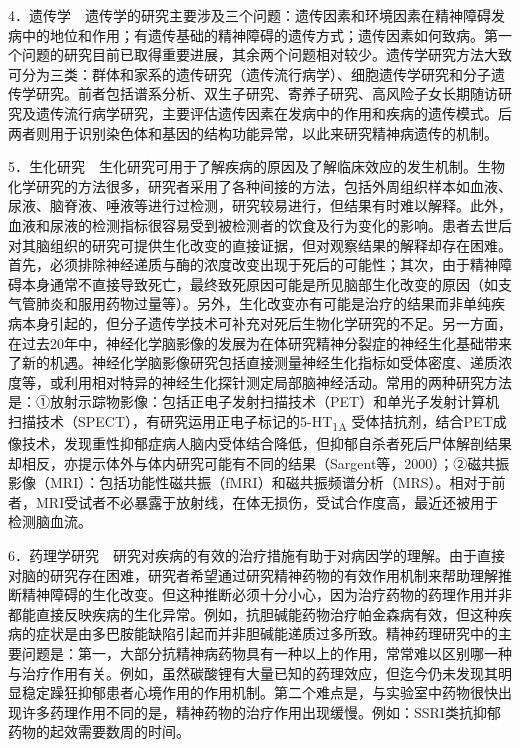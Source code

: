 4．遗传学　遗传学的研究主要涉及三个问题：遗传因素和环境因素在精神障碍发病中的地位和作用；有遗传基础的精神障碍的遗传方式；遗传因素如何致病。第一个问题的研究目前已取得重要进展，其余两个问题相对较少。遗传学研究方法大致可分为三类：群体和家系的遗传研究（遗传流行病学）、细胞遗传学研究和分子遗传学研究。前者包括谱系分析、双生子研究、寄养子研究、高风险子女长期随访研究及遗传流行病学研究，主要评估遗传因素在发病中的作用和疾病的遗传模式。后两者则用于识别染色体和基因的结构功能异常，以此来研究精神病遗传的机制。

5．生化研究　生化研究可用于了解疾病的原因及了解临床效应的发生机制。生物化学研究的方法很多，研究者采用了各种间接的方法，包括外周组织样本如血液、尿液、脑脊液、唾液等进行过检测，研究较易进行，但结果有时难以解释。此外，血液和尿液的检测指标很容易受到被检测者的饮食及行为变化的影响。患者去世后对其脑组织的研究可提供生化改变的直接证据，但对观察结果的解释却存在困难。首先，必须排除神经递质与酶的浓度改变出现于死后的可能性；其次，由于精神障碍本身通常不直接导致死亡，最终致死原因可能是所见脑部生化改变的原因（如支气管肺炎和服用药物过量等）。另外，生化改变亦有可能是治疗的结果而非单纯疾病本身引起的，但分子遗传学技术可补充对死后生物化学研究的不足。另一方面，在过去20年中，神经化学脑影像的发展为在体研究精神分裂症的神经生化基础带来了新的机遇。神经化学脑影像研究包括直接测量神经生化指标如受体密度、递质浓度等，或利用相对特异的神经生化探针测定局部脑神经活动。常用的两种研究方法是：①放射示踪物影像：包括正电子发射扫描技术（PET）和单光子发射计算机扫描技术（SPECT），有研究运用正电子标记的5-HT\textsubscript{1A}
受体拮抗剂，结合PET成像技术，发现重性抑郁症病人脑内受体结合降低，但抑郁自杀者死后尸体解剖结果却相反，亦提示体外与体内研究可能有不同的结果（Sargent等，2000）；②磁共振影像（MRI）：包括功能性磁共振（fMRI）和磁共振频谱分析（MRS）。相对于前者，MRI受试者不必暴露于放射线，在体无损伤，受试合作度高，最近还被用于检测脑血流。

6．药理学研究　研究对疾病的有效的治疗措施有助于对病因学的理解。由于直接对脑的研究存在困难，研究者希望通过研究精神药物的有效作用机制来帮助理解推断精神障碍的生化改变。但这种推断必须十分小心，因为治疗药物的药理作用并非都能直接反映疾病的生化异常。例如，抗胆碱能药物治疗帕金森病有效，但这种疾病的症状是由多巴胺能缺陷引起而并非胆碱能递质过多所致。精神药理研究中的主要问题是：第一，大部分抗精神病药物具有一种以上的作用，常常难以区别哪一种与治疗作用有关。例如，虽然碳酸锂有大量已知的药理效应，但迄今仍未发现其明显稳定躁狂抑郁患者心境作用的作用机制。第二个难点是，与实验室中药物很快出现许多药理作用不同的是，精神药物的治疗作用出现缓慢。例如：SSRI类抗抑郁药物的起效需要数周的时间。

